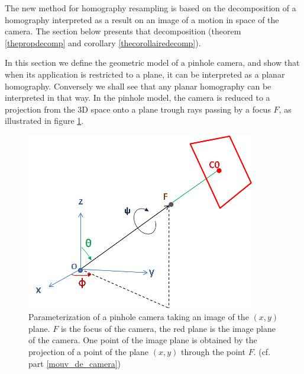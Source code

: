 The new method for homography resampling is based on the decomposition of a homography interpreted as a result on an image of a motion in space of the camera. The section below presents that decomposition (theorem \ref{thepropdecomp} and corollary \ref{thecorollairedecomp}).



\label{mouv_de_camera}

In this section we define the geometric model of a pinhole camera, and show that when its application is restricted to a plane, it can be interpreted as a planar homography. Conversely we shall see that any planar homography can be interpreted in that way. In the pinhole model, the camera is reduced to a projection from the 3D space  onto a plane trough rays passing by a focus $F$,  as illustrated in figure \ref{shmdecomp}.



\begin{figure}[h!]

\centering
\includegraphics[width=10cm]{shema_decomp.png}
\caption{Parameterization of a pinhole camera taking an image of the $(x,y)$ plane. $F$ is the focus of the camera, the red plane is the image plane of the camera.  One point of the image plane is obtained by the projection of a point of the plane $(x,y)$ through the point $F$. (cf. part \ref{mouv_de_camera})}
\label{shmdecomp}
\end{figure}

